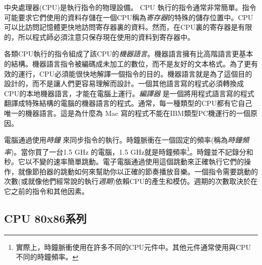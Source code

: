 中央處理器(CPU)是執行指令的物理設備。 CPU
執行的指令通常非常簡單。指令可能要求它們使用的資料存儲在一個CPU稱為\emph{寄存器}的特殊的儲存位置中。CPU可以比訪問記憶體更快地訪問寄存器裏的資料。然而，在CPU裏的寄存器是有限的，所以程式師必須注意只保存現在使用的資料到寄存器中。

各類CPU執行的指令組成了該CPU的\emph{機器語言}。機器語言擁有比高階語言更基本的結構。機器語言指令被編碼成未加工的數位，而不是友好的文本格式。為了更有效的運行，CPU必須能很快地解譯一個指令的目的。機器語言就是為了這個目的設計的，而不是讓人們更容易理解而設計。一個其他語言寫的程式必須轉換成CPU的本地機器語言，才能在電腦上運行。\emph{編譯器}
是一個將用程式語言寫的程式翻譯成特殊結構的電腦的機器語言的程式。通常，每一種類型的CPU都有它自己唯一的機器語言。這是為什麼為
Mac 寫的程式不能在IBM類型PC機運行的一個原因。

電腦通過使用\emph{時鐘}
來同步指令的執行。時鐘脈衝在一個固定的頻率(稱為\emph{時鐘頻率})。當你買了一台1.5 GHz 的電腦，1.5 GHz就是時鐘頻率\footnote{實際上，時鐘脈衝使用在許多不同的CPU元件中。其他元件通常使用與CPU不同的時鐘頻率。}。時鐘並不記錄分和秒。它以不變的速率簡單跳動。電子電腦通過使用這個跳動來正確執行它們的操作，就像節拍器的跳動如何來幫助你以正確的節奏播放音樂。一個指令需要跳動的次數(或就像他們經常說的執行\emph{週期})依賴CPU的產生和模仿。週期的次數取決於在它之前的指令和其他因素。


\subsection{CPU 80x86系列}

